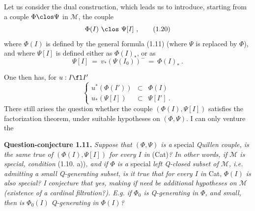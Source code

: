 Let us consider the dual construction, which leads us to introduce, starting from a couple $\Phi \clos \Psi$ in $\mathcal{M}$, the couple
\[
\Phi(I) \ \clos\ \Psi[I]\ , \tag*{(1.20)}
\]
where $\Phi(I)$ is defined by the general formula (1.11) (where $\Psi$ is replaced by $\Phi$), and where $\Psi[I]$ is defined either as $\Phi(I)_{*}$, or as
\[
\Psi[I] \ =\ v_{*}(\Psi(I_0))^{-} \ =\ \Phi(I)_{*}\ . \tag*{(1.21)}
\]

One then has, for $u : I \fl I'$
\[
\left\{
\begin{array}{rcl}
u^{*}(\Phi(I')) & \subset & \Phi(I) \\
u_{*}(\Psi[I]) & \subset & \Psi[I']\ .
\end{array}
\right.
\tag*{(1.22)}
\]
There still arises the question whether the couple $(\Phi(I), \Psi[I])$ satisfies the factorization theorem, under suitable hypotheses on $(\Phi, \Psi)$. I can only venture the

\textbf{Question-conjecture 1.11.} \textit{Suppose that $(\Phi, \Psi)$ is a} special \textit{Quillen couple, is the same true of $(\Phi(I), \Psi[I])$ for every $I$ in} (Cat)\textit{? In other words, if $\mathcal{M}$ is special, condition} (1.10. a))\textit{, and if $\Phi$ is a} special \textit{left Q-closed subset of $\mathcal{M}$, i.e. admitting a small Q-generating subset, is it true that for every $I$ in} Cat, \textit{$\Phi(I)$ is also special? I conjecture that yes, making if need be additional hypotheses on $\mathcal{M}$ (existence of a cardinal filtration?). E.g. if $\Phi_0$ is Q-generating in $\Phi$, and small, then is $\Phi_0(I)$ Q-generating in $\Phi(I)$?}

